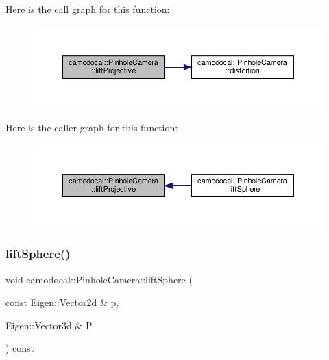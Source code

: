 Here is the call graph for this function\+:\nopagebreak
\begin{figure}[H]
\begin{center}
\leavevmode
\includegraphics[width=350pt]{classcamodocal_1_1PinholeCamera_a8a557882a34c5269f6254df6e1d9bb4f_cgraph}
\end{center}
\end{figure}
Here is the caller graph for this function\+:\nopagebreak
\begin{figure}[H]
\begin{center}
\leavevmode
\includegraphics[width=350pt]{classcamodocal_1_1PinholeCamera_a8a557882a34c5269f6254df6e1d9bb4f_icgraph}
\end{center}
\end{figure}
\mbox{\label{classcamodocal_1_1PinholeCamera_a0a4191ba420ee40355d8eb0f5cf587a7}} 
\subsubsection{\texorpdfstring{lift\+Sphere()}{liftSphere()}}
{\footnotesize\ttfamily void camodocal\+::\+Pinhole\+Camera\+::lift\+Sphere (\begin{DoxyParamCaption}\item[{const Eigen\+::\+Vector2d \&}]{p,  }\item[{Eigen\+::\+Vector3d \&}]{P }\end{DoxyParamCaption}) const\hspace{0.3cm}{\ttfamily [virtual]}}




